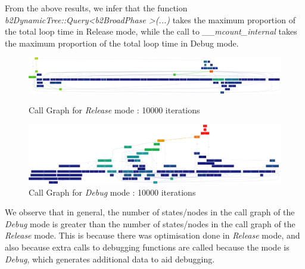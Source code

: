 \documentclass[10pt]{article} \usepackage[a4paper,left=0.8in,right=0.8in,top=0.4in,bottom=0.8in]{geometry} \usepackage{graphicx}
\begin{document}
From the above results, we infer that the function \textit{b2DynamicTree::Query\textless b2BroadPhase \textgreater(...)} takes the maximum proportion of the total loop time in Release mode, while the call to \textit{\_\_mcount\_internal} takes the maximum proportion of the total loop time in Debug mode.

\begin{figure}[ht!] 
\centering 
\includegraphics[width=1\textwidth]{images/release_cg.png} 
\caption{Call Graph for \textit{Release} mode : 10000 iterations}
\includegraphics[width=1\textwidth]{images/debug_cg.png} 
\caption{Call Graph for \textit{Debug} mode : 10000 iterations}
\end{figure}
We observe that in general, the number of states/nodes in the call graph of the \textit{Debug} mode is greater than the number of states/nodes in the call graph of the \textit{Release} mode. This is because there was optimisation done in \textit{Release} mode, and also because extra calls to debugging functions are called because the mode is \textit{Debug}, which generates additional data to aid debugging.




\end{document}
